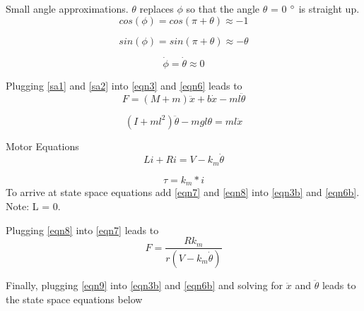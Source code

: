 \documentclass{article}
\begin{document}
Small angle approximations. $\theta$ \textrm{ replaces } $\phi$ \textrm{ so that the angle } $\theta$ \textrm{ = 0} $\degree$ \textrm{ is straight up}.
\\

\begin{equation} 
\label{sa1}
cos(\phi) = cos(\pi + \theta) \approx -1
\end{equation}

\begin{equation} 
\label{sa2}
sin(\phi) = sin(\pi + \theta) \approx -\theta
\end{equation}

\begin{equation} 
\label{sa3}
\dot{\phi} = \dot{\theta} \approx 0
\end{equation}

Plugging \ref{sa1} and \ref{sa2} into \ref{eqn3} and \ref{eqn6} leads to
\begin{equation} 
\label{eqn3b}
F = (M+m)\ddot{x}+b\dot{x} -m l \ddot{\theta}
\end{equation}

\begin{equation} 
\label{eqn6b}
(I+m l^2)\ddot{\theta} - m g l\theta = m l \ddot{x}
\end{equation}

Motor Equations
\begin{equation} 
\label{eqn7}
L i + R i = V - k_m\dot{\theta}
\end{equation}

\begin{equation} 
\label{eqn8}
\tau = k_m*i
\end{equation}
To arrive at state space equations add \ref{eqn7} and \ref{eqn8} into \ref{eqn3b} and \ref{eqn6b}. Note: L = 0.

Plugging \ref{eqn8} into \ref{eqn7} leads to 
\begin{equation} 
\label{eqn9}
F = \frac{R k_m}{r(V-k_m\dot{\theta})}
\end{equation}

Finally, plugging \ref{eqn9} into \ref{eqn3b} and \ref{eqn6b} and solving for $\ddot{x}$ and $\ddot{\theta}$ leads to the state space equations below
\end{document}
